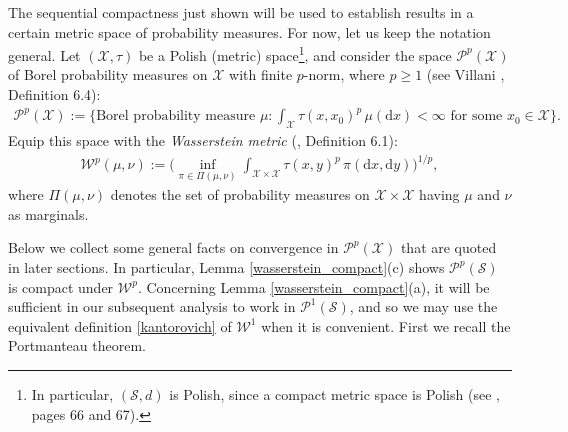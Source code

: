 \documentclass[11pt,reqno]{amsart}
\numberwithin{equation}{section}
\theoremstyle{definition}
\begin{document}
The sequential compactness just shown will be used to establish results in a certain metric space of probability measures.
For now, let us keep the notation general.
Let $({\mathcal{X}},\tau)$ be a Polish (metric) space\footnote{In particular, $({\mathcal{S}},d)$ is Polish, since a compact metric space is Polish (see \cite{seebach-steen78}, pages 66 and 67).}, and consider the space ${\mathcal{P}}^p({\mathcal{X}})$ of Borel probability measures on ${\mathcal{X}}$ with finite $p$-norm, where $p \geq 1$ (see Villani \cite{villani09}, Definition 6.4):
{\begin{align*} {
{\mathcal{P}}^p({\mathcal{X}}) := \bigg\{\text{Borel probability measure } \mu: \int_{\mathcal{X}} \tau(x,x_0)^p\, \mu({\mathrm{d}} x) < \infty \text{ for some } x_0 \in {\mathcal{X}}\bigg\}.
} \end{align*}}
Equip this space with the \textit{Wasserstein metric} (\cite{villani09}, Definition 6.1):
{\begin{align*} {
{\mathcal{W}}^p(\mu,\nu) := \bigg(\inf_{\pi \in \Pi(\mu,\nu) }\int_{{\mathcal{X}} \times {\mathcal{X}}} \tau(x,y)^p\, \pi({\mathrm{d}} x,{\mathrm{d}} y)\bigg)^{1/p},
} \end{align*}}
where $\Pi(\mu,\nu)$ denotes the set of probability measures on ${\mathcal{X}} \times {\mathcal{X}}$ having $\mu$ and $\nu$ as marginals.

Below we collect some general facts on convergence in ${\mathcal{P}}^p({\mathcal{X}})$ that are quoted in later sections.
In particular, Lemma \ref{wasserstein_compact}(c) shows ${\mathcal{P}}^p({\mathcal{S}})$ is compact under $\mathcal{W}^p$.
Concerning Lemma \ref{wasserstein_compact}(a), it will be sufficient in our subsequent analysis to work in ${\mathcal{P}}^1({\mathcal{S}})$, and so we may use the equivalent definition \eqref{kantorovich} of ${\mathcal{W}}^1$ when it is convenient.
First we recall the Portmanteau theorem.
\end{document}
